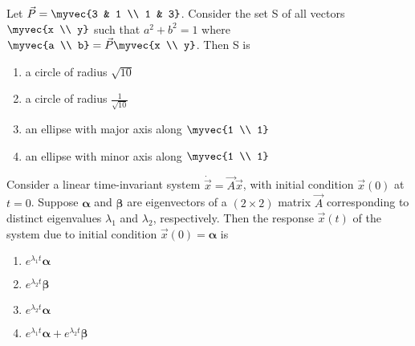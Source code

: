     \item Let $\vec{P} = \myvec{3 & 1 \\ 1 & 3}$. Consider the set S of all vectors $\myvec{x \\ y}$ such that $a^2+b^2=1$ where $\myvec{a \\ b} = \vec{P}\myvec{x \\ y}$. Then S is
    \hfill{}
        \begin{multicols}{2}
    \begin{enumerate}
        \item a circle of radius $\sqrt{10}$
        \item a circle of radius $\frac{1}{\sqrt{10}}$
        \item an ellipse with major axis along $\myvec{1 \\ 1}$
        \item an ellipse with minor axis along $\myvec{1 \\ 1}$
    \end{enumerate}
        \end{multicols}
    \item Consider a linear time-invariant system $\dot{\vec{x}}=\vec{A}\vec{x}$, with initial condition $\vec{x}(0)$ at $t=0$.
Suppose $\bm{\alpha}$ and $\bm{\beta}$ are eigenvectors of a $(2\times2)$ matrix $\vec{A}$ corresponding to
distinct eigenvalues $\lambda_1$ and $\lambda_2$, respectively. Then the response $\vec{x}(t)$ of the
system due to initial condition $\vec{x}(0)=\bm{\alpha}$ is
    \hfill{}
        \begin{multicols}{4}
    \begin{enumerate}
            \item $e^{\lambda_1 t}\bm{\alpha}$
            \item $e^{\lambda_2 t}\bm{\beta}$
            \item $e^{\lambda_2 t}\bm{\alpha}$
            \item $e^{\lambda_1 t}\bm{\alpha} + e^{\lambda_2 t}\bm{\beta}$
    \end{enumerate}
        \end{multicols}

